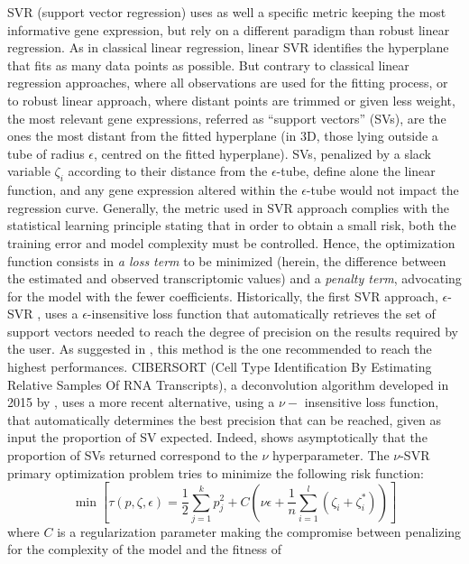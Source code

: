 SVR (support vector regression) uses as well a specific metric keeping
the most informative gene expression, but rely on a different paradigm
than robust linear regression. As in classical linear regression, linear
SVR identifies the hyperplane that fits as many data points as possible.
But contrary to classical linear regression approaches, where all
observations are used for the fitting process, or to robust linear
approach, where distant points are trimmed or given less weight, the
most relevant gene expressions, referred as ``support vectors'' (SVs),
are the ones the most distant from the fitted hyperplane (in 3D, those
lying outside a tube of radius \(\epsilon\), centred on the fitted
hyperplane). SVs, penalized by a slack variable \(\zeta_i\) according to
their distance from the \(\epsilon\)-tube, define alone the linear
function, and any gene expression altered within the \(\epsilon\)-tube
would not impact the regression curve. Generally, the metric used in SVR
approach complies with the statistical learning principle stating that
in order to obtain a small risk, both the training error and model
complexity must be controlled. Hence, the optimization function consists
in \emph{a loss term} to be minimized (herein, the difference between
the estimated and observed transcriptomic values) and a \emph{penalty
term}, advocating for the model with the fewer coefficients.
Historically, the first SVR approach, \(\epsilon\)-SVR
\autocite{cortes_vapnik95}, uses
a \(\epsilon\)-insensitive loss function that automatically retrieves
the set of support vectors needed to reach the degree of precision on
the results required by the user. As suggested in
\autocite{cc_cj02}, this method is the
one recommended to reach the highest performances. CIBERSORT (Cell Type
Identification By Estimating Relative Samples Of RNA Transcripts), a
deconvolution algorithm developed in 2015 by
\autocite{newman_etal15}, uses a
more recent alternative, using a \(\nu-\) insensitive loss function,
that automatically determines the best precision that can be reached,
given as input the proportion of SV expected. Indeed,
\autocite{scholkopf_etal00} shows
asymptotically that the proportion of SVs returned correspond to the
\(\nu\) hyperparameter. The \(\nu\)-SVR primary optimization problem
tries to minimize the following risk function: \[
\min \left[ \tau (p, \zeta, \epsilon) = \frac{1}{2} \sum_{j=1}^k p_j^2 + C \left( \nu \epsilon + \frac{1}{n} \sum_{i=1}^l (\zeta_i + \zeta_i^* )\right) \right]
\] where \(C\) is a regularization parameter making the compromise
between penalizing for the complexity of the model and the fitness of
